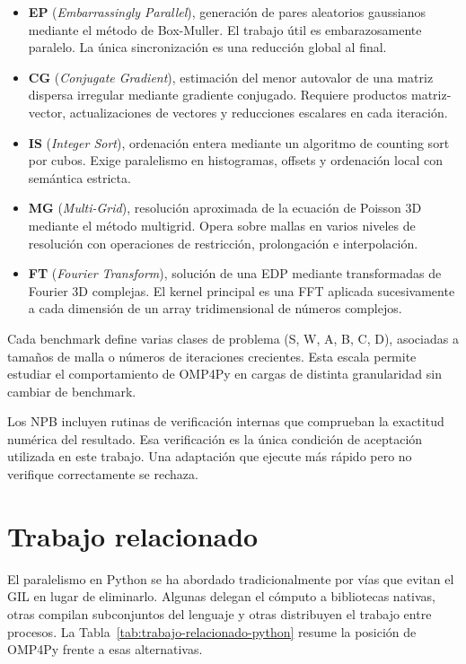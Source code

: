 \begin{itemize}
  \item \textbf{EP} (\emph{Embarrassingly Parallel}), generación de pares
        aleatorios gaussianos mediante el método de Box-Muller. El trabajo
        útil es embarazosamente paralelo. La única sincronización es una
        reducción global al final.
  \item \textbf{CG} (\emph{Conjugate Gradient}), estimación del menor
        autovalor de una matriz dispersa irregular mediante gradiente conjugado.
        Requiere productos matriz-vector, actualizaciones de vectores y
        reducciones escalares en cada iteración.
  \item \textbf{IS} (\emph{Integer Sort}), ordenación entera mediante un
        algoritmo de counting sort por cubos. Exige paralelismo en histogramas,
        offsets y ordenación local con semántica estricta.
  \item \textbf{MG} (\emph{Multi-Grid}), resolución aproximada de la ecuación
        de Poisson 3D mediante el método multigrid. Opera sobre mallas en varios
        niveles de resolución con operaciones de restricción, prolongación e
        interpolación.
  \item \textbf{FT} (\emph{Fourier Transform}), solución de una EDP mediante
        transformadas de Fourier 3D complejas. El kernel principal es una FFT
        aplicada sucesivamente a cada dimensión de un array tridimensional de
        números complejos.
\end{itemize}

Cada benchmark define varias clases de problema (S, W, A, B, C, D), asociadas a
tamaños de malla o números de iteraciones crecientes. Esta escala permite
estudiar el comportamiento de OMP4Py en cargas de distinta granularidad sin
cambiar de benchmark.

Los NPB incluyen rutinas de verificación internas que comprueban la exactitud
numérica del resultado. Esa verificación es la única condición de aceptación
utilizada en este trabajo. Una adaptación que ejecute más rápido pero no
verifique correctamente se rechaza.


\section{Trabajo relacionado}
\label{sec:trabajo-relacionado}

El paralelismo en Python se ha abordado tradicionalmente por vías que evitan el
GIL en lugar de eliminarlo. Algunas delegan el cómputo a bibliotecas nativas,
otras compilan subconjuntos del lenguaje y otras distribuyen el trabajo entre
procesos. La Tabla~\ref{tab:trabajo-relacionado-python} resume la posición de
OMP4Py frente a esas alternativas.

